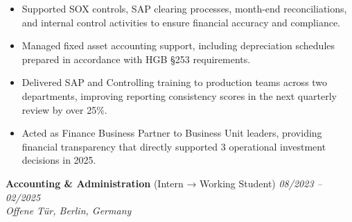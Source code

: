 \documentclass[a4paper,10pt]{article}
\begin{document}
\begin{itemize}[itemsep=0pt, topsep=0pt, leftmargin=2em]
\item Supported SOX controls, SAP clearing processes, month-end reconciliations, and internal control activities to ensure financial accuracy and compliance.

\item Managed fixed asset accounting support, including depreciation schedules prepared in accordance with HGB \S 253 requirements.

\item Delivered SAP and Controlling training to production teams across two departments, improving reporting consistency scores in the next quarterly review by over 25\%.

\item Acted as Finance Business Partner to Business Unit leaders, providing financial transparency that directly supported 3 operational investment decisions in 2025.


    
    
\end{itemize}



\vspace{2pt}

\textbf{Accounting \& Administration} (Intern → Working Student)
\hfill \textit{08/2023 – 02/2025}\\
\textit{Offene Tür, Berlin, Germany}\\
\end{document}
